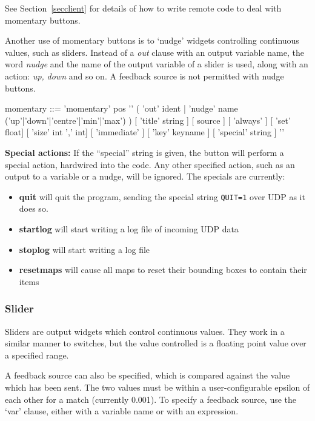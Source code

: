 See Section~\ref{secclient} for details of how to write remote
code to deal with momentary buttons.

Another use of momentary buttons is to `nudge' widgets controlling continuous
values, such as sliders. Instead of a \emph{out} clause with an output
variable name, the word \emph{nudge} and the name of the output variable of a
slider is used, along with an action: \emph{up,} \emph{down} and so on. A
feedback source is not permitted with nudge buttons.
\begin{v}
momentary  ::= 'momentary' pos '{'
                    ( 'out' ident |
                      'nudge' name ('up'|'down'|'centre'|'min'|'max') )
                    [ 'title' string ]
                    [ source ]
                    [ 'always' ]
                    [ 'set' float]
                    [ 'size' int ',' int]
                    [ 'immediate' ]
                    [ 'key' keyname ]
                    [ 'special' string ]
                '}'
\end{v}


\textbf{Special actions:} If the ``special'' string is given, the button will
perform a special action, hardwired into the code. Any other specified action,
such as an output to a variable or a nudge, will be ignored. The specials are
currently:
\begin{itemize}
\item \textbf{quit} will quit the program, sending the special string
\texttt{QUIT=1} over UDP as it does so.
\item \textbf{startlog} will start writing a log file of incoming UDP data
\item \textbf{stoplog} will start writing a log file
\item \textbf{resetmaps} will cause all maps to reset their bounding boxes to contain their items
\end{itemize}


\subsubsection{Slider}
Sliders are output widgets which control continuous values. They
work in a similar manner to switches, but the value controlled
is a floating point value over a specified range.

A feedback source can also be specified, which is compared against
the value which has been sent. The two values must be within
a user-configurable epsilon of each other for a match (currently 0.001).
To specify a feedback source, use the `var' clause, either with a variable name
or with an expression.

